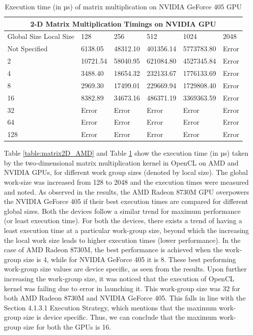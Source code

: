 \begin{table}[h!]
\centering
 \caption{Execution time (in µs) of matrix multiplication on NVIDIA GeForce 405 GPU}
 \begin{tabular}{ | m{5em} | m{2cm} | m{2cm} | m{2cm} | m{2cm} | m{2cm} |}
 \hline
 \multicolumn{6}{|c|}{2-D Matrix Multiplication Timings on NVIDIA GPU} \\
 \hline
  Global Size Local Size & 128 & 256 & 512 & 1024 & 2048\\
 \hline
 Not Specified & 6138.05 & 48312.10 & 401356.14 & 5773783.80 & Error\\	
 2 & 10721.54 & 58040.95 & 621084.80 & 4527345.84 & Error\\
 4 & 3488.40 & 18654.32 & 232133.67 & 1776133.69 & Error\\
 8 & 2969.30 & 17499.01 & 229669.94 & 1729808.40 & Error \\
 16 & 8382.89 & 34673.16 & 486371.19 & 3369363.59 & Error\\
 32 & Error & Error & Error & Error & Error\\
 64 & Error & Error & Error & Error & Error\\
 128 & Error & Error & Error & Error & Error\\
 \hline
 \end{tabular}
 \label{table:matrix2D_NVIDIA}
\end{table}

Table \ref{table:matrix2D_AMD} and Table \ref{table:matrix2D_NVIDIA} show the execution time (in µs) taken by the two-dimensional matrix multiplication kernel in OpenCL on AMD and NVIDIA GPUs, for different work group sizes (denoted by local size). The global work-size was increased from 128 to 2048 and the execution times were measured and noted. \newline\newline
As observed in the results, the AMD Radeon 8730M GPU overpowers the NVIDIA GeForce 405 if their best execution times are compared for different global sizes. Both the devices follow a similar trend for maximum performance (or least execution time). For both the devices, there exists a trend of having a least execution time at a particular work-group size, beyond which the increasing the local work size leads to higher execution times (lower performance). In the case of AMD Radeon 8730M, the best performance is achieved when the work-group size is 4, while for NVIDIA GeForce 405 it is 8. These best performing work-group size values are device specific, as seen from the results. \newline\newline
Upon further increasing the work-group size, it was noticed that the execution of OpenCL kernel was failing due to error in launching it. This work-group size was 32 for both AMD Radeon 8730M and NVIDIA GeForce 405. This falls in line with the Section 4.1.3.1 Execution Strategy, which mentions that the maximum work-group size is device specific. Thus, we can conclude that the maximum work-group size for both the GPUs is 16. \newline
